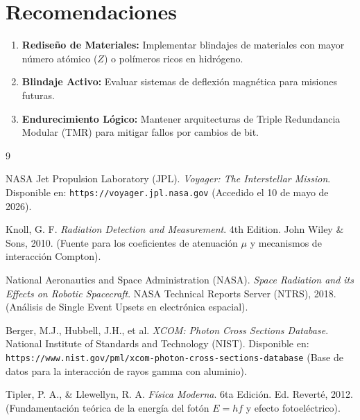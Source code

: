 \documentclass[12pt,a4paper]{article}
\begin{document}
\section{Recomendaciones}
\begin{enumerate}
    \item \textbf{Rediseño de Materiales:} Implementar blindajes de materiales con mayor número atómico ($Z$) o polímeros ricos en hidrógeno.
    \item \textbf{Blindaje Activo:} Evaluar sistemas de deflexión magnética para misiones futuras.
    \item \textbf{Endurecimiento Lógico:} Mantener arquitecturas de Triple Redundancia Modular (TMR) para mitigar fallos por cambios de bit.
\end{enumerate}

\begin{thebibliography}{9}

NASA Jet Propulsion Laboratory (JPL).
\textit{Voyager: The Interstellar Mission}. 
Disponible en: \texttt{https://voyager.jpl.nasa.gov}
(Accedido el 10 de mayo de 2026).

Knoll, G. F. 
\textit{Radiation Detection and Measurement}. 
4th Edition. John Wiley \& Sons, 2010. 
(Fuente para los coeficientes de atenuación $\mu$ y mecanismos de interacción Compton).

National Aeronautics and Space Administration (NASA). 
\textit{Space Radiation and its Effects on Robotic Spacecraft}. 
NASA Technical Reports Server (NTRS), 2018. 
(Análisis de Single Event Upsets en electrónica espacial).

Berger, M.J., Hubbell, J.H., et al. 
\textit{XCOM: Photon Cross Sections Database}. 
National Institute of Standards and Technology (NIST). 
Disponible en: \texttt{https://www.nist.gov/pml/xcom-photon-cross-sections-database}
(Base de datos para la interacción de rayos gamma con aluminio).

Tipler, P. A., \& Llewellyn, R. A. 
\textit{Física Moderna}. 
6ta Edición. Ed. Reverté, 2012. 
(Fundamentación teórica de la energía del fotón $E=hf$ y efecto fotoeléctrico).

\end{thebibliography}
\end{document}
